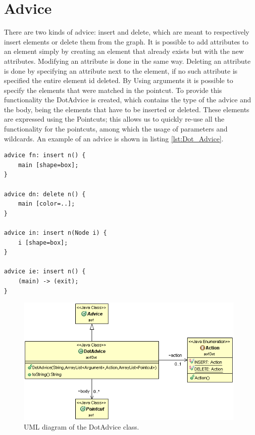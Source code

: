 \documentclass[a4paper]{report}
\begin{document}
\section{Advice}
There are two kinds of advice: insert and delete, which are meant to respectively insert elements or delete them from the graph. It is possible to add attributes to an element simply by creating an element that already exists but with the new attributes. Modifying an attribute is done in the same way. Deleting an attribute is done by specifying an attribute next to the element, if no such attribute is specified the entire element id deleted. By Using arguments it is possible to specify the elements that were matched in the pointcut. To provide this functionality the DotAdvice is created, which contains the type of the advice and the body, being the elements that have to be inserted or deleted. These elements are expressed using the Pointcuts; this allows us to quickly re-use all the functionality for the pointcuts, among which the usage of parameters and wildcards. An example of an advice is shown in listing \ref{lst:Dot_Advice}.
\begin{lstlisting}[caption=Some examples of advice., label=lst:Dot_Advice]
advice fn: insert n() {
	main [shape=box];
}

advice dn: delete n() {
	main [color=..];
}

advice in: insert n(Node i) {
	i [shape=box];
}

advice ie: insert n() {
	(main) -> (exit);
}
\end{lstlisting}
\begin{figure}
\centering
\includegraphics[scale=0.6]{images/AOFDot/DotAdvice.png}
\caption{UML diagram of the DotAdvice class.}
\label{fig:DotAdvice}
\end{figure}
\end{document}
